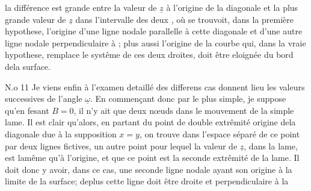 \documentclass[11pt,a4paper]{article}
\begin{document}

la différence est grande entre la valeur de $\underline{z}$ à l'origine
de la diagonale et la plus grande valeur de $\underline{z}$ dans
l'intervalle des deux  , où se trouvoit, dans la première
hypothese, l'origine d'une ligne nodale parallelle à cette
diagonale et d'une autre ligne nodale perpendiculaire
à   ; plus aussi l'origine de la courbe qui, dans
 la vraie hypothese, remplace le systême de
ces deux droites, doit être eloignée du bord dela
surface.

N.o 11 Je viens enfin à l'examen detaillé des differens cas
  donnent lieu les  valeurs successives de
l'angle $\underline{\omega}$.  En commençant donc par  le plus simple,
je suppose qu'en fesant $B=0$, il n'y ait que deux
nœuds dans le mouvement de la simple lame. Il
est clair qu'alors, en partant du point de double extrêmité
origine dela diagonale due à la supposition $x=y$,
on trouve dans l'espace séparé de ce point par deux
lignes fictives, un autre point pour lequel la valeur de
$\underline{z}$, dans la lame, est lamême qu'à l'origine, et que
ce point est la seconde extrêmité de la lame. Il
doit donc y avoir, dans ce cas, une seconde ligne nodale
ayant son origine à la limite de la surface; deplus
cette ligne doit être droite et perpendiculaire à la
\end{document}
